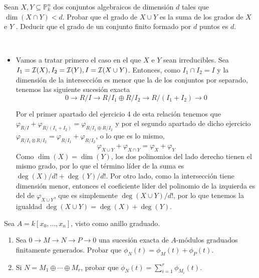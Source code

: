 \documentclass[twoside]{article}
\begin{document}
\newpage

\begin{ejercicio}{2}
 
Sean $X, Y ⊆ \mathbb{P}^n_k$
dos conjuntos algebraicos de dimensión $d$ tales
que $\dim(X ∩Y ) < d$. Probar que el grado de $X ∪Y$ es la suma de los grados de
$X$ e $Y$ . Deducir que el grado de un conjunto finito formado por $d$ puntos es $d$.
\end{ejercicio}

\begin{solucion}\
\begin{itemize}
\item Vamos a tratar primero el caso en el que $X$ e $Y$ sean irreducibles. Sea $I_1=\mathcal{I}(X),  I_2=\mathcal{I}(Y), I=\mathcal{I}(X\cup Y)$. Entonces, como $I_1\cap I_2=I$ y la dimensión de la intersección es menor que la de los conjuntos por separado, tenemos las siguiente sucesión exacta
\[
0\to R/I\to R/I_1\oplus R/I_2\to R/(I_1+I_2)\to 0
\]

Por el primer apartado del ejercicio 4 de esta relación tenemos que $\varphi_{R/I}+\varphi_{R/(I_1+I_2)}=\varphi_{R/I_1\oplus R/I_2}$ y por el segundo apartado de dicho ejercicio $\varphi_{R/I_1\otimes R/I_2}=\varphi_{R/I_1} + \varphi_{R/I_2}$, o lo que es lo mismo,
\[
\varphi_{X\cup Y}+\varphi_{X\cap Y}=\varphi_{X} + \varphi_{Y}
\]
Como $\dim(X)=\dim(Y)$, los dos polinomios del lado derecho tienen el mismo grado, por lo que el término líder de la suma es $\deg(X)/d!+\deg(Y)/d!$. Por otro lado, como la intersección tiene dimensión menor, entonces el coeficiente líder del polinomio de la izquierda es del de $\varphi_{X\cup Y}$, que es simplemente $\deg(X\cup Y)/d!$, por lo que tenemos la igualdad $\deg(X\cup Y)=\deg(X)+\deg(Y)$.
\end{itemize}
\end{solucion}
\newpage

\begin{ejercicio}{4}
 Sea $A=k[x_0,\dotsc,x_n]$, visto como anillo graduado.
\begin{enumerate}
\item Sea $0\to M\to N\to P \to 0$ una sucesión exacta de $A$-módulos graduados finitamente generados. Probar que $\phi_N(t)=\phi_M(t)+\phi_P(t)$.
\item Si $N=M_1\oplus\cdots\oplus M_r$, probar que $\phi_N(t)=\sum_{i=1}^r\phi_{M_i}(t)$.
\end{enumerate}
\end{ejercicio}
\end{document}
